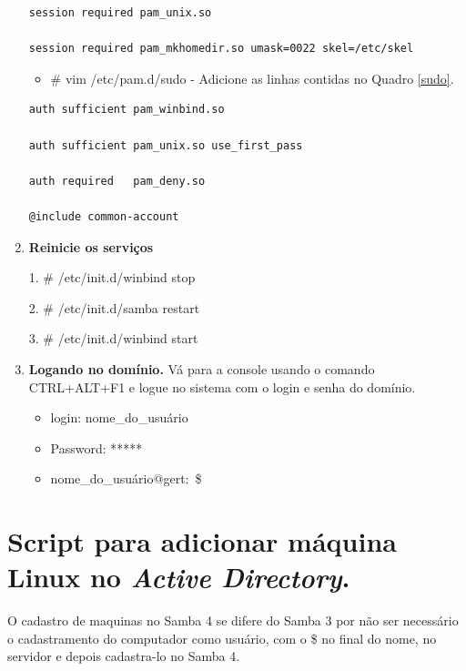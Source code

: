\begin{enumerate}
		\begin{lstlisting}[caption=Arquivo /etc/pam.d/common-session,label={common_session}]
session required pam_unix.so

session required pam_mkhomedir.so umask=0022 skel=/etc/skel
		\end{lstlisting}

		\begin{itemize}
			\item {\# vim /etc/pam.d/sudo} - Adicione as linhas contidas no Quadro \ref{sudo}.\\
		\end{itemize}

		\begin{lstlisting}[caption=Arquivo /etc/pam.d/sudo,label={sudo}]
auth sufficient pam_winbind.so

auth sufficient pam_unix.so use_first_pass

auth required   pam_deny.so

@include common-account
		\end{lstlisting}

	\item \textbf{Reinicie os serviços}

			1. \# /etc/init.d/winbind stop
			
			2. \# /etc/init.d/samba restart		
			
			3. \# /etc/init.d/winbind start
			
	\item \textbf{Logando no domínio.}
		Vá para a console usando o comando CTRL+ALT+F1 e logue no sistema com o login e senha do domínio.

		\begin{itemize}
			\item {login: nome\_do\_usuário}
			\item {Password: *****}
			\item {nome\_do\_usuário$@$gert:~\$}
		\end{itemize}

\end{enumerate}

\section{Script para adicionar máquina Linux no \textit{Active Directory}.}

O cadastro de maquinas no Samba 4 se difere do Samba 3 por não ser necessário o cadastramento do computador como usuário, com o \$ no final do nome, no servidor e depois cadastra-lo no Samba 4.

